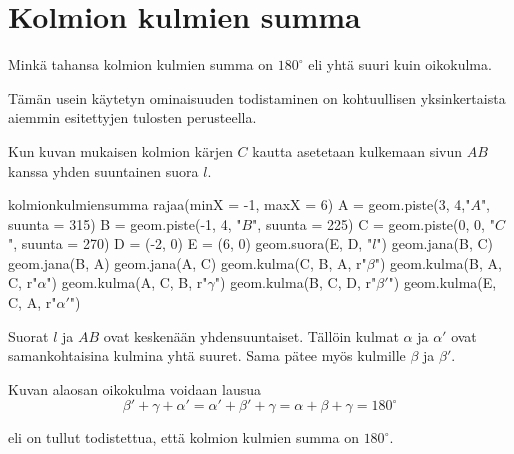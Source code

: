 \section*{Kolmion kulmien summa}

Minkä tahansa kolmion kulmien summa on $ 180^{\circ}$ eli yhtä suuri kuin oikokulma.

Tämän usein käytetyn ominaisuuden todistaminen on kohtuullisen yksinkertaista aiemmin esitettyjen tulosten perusteella.

Kun kuvan mukaisen kolmion kärjen $C$ kautta asetetaan kulkemaan sivun $AB$ kanssa yhden suuntainen suora $l$.




\begin{kuva}{kolmionkulmiensumma}
	rajaa(minX = -1, maxX = 6)
	A = geom.piste(3, 4,"$A$", suunta = 315)
	B = geom.piste(-1, 4, "$B$", suunta = 225)
	C = geom.piste(0, 0, "$C$", suunta = 270)
	D = (-2, 0)
	E = (6, 0)
	geom.suora(E, D, "$l$")
	geom.jana(B, C)
	geom.jana(B, A)
	geom.jana(A, C)
	geom.kulma(C, B, A, r"$\beta$")
	geom.kulma(B, A, C, r"$\alpha$")
	geom.kulma(A, C, B, r"$\gamma$")
	geom.kulma(B, C, D, r"$\beta'$")
	geom.kulma(E, C, A, r"$\alpha'$")
\end{kuva}

Suorat $l$ ja $AB$ ovat keskenään yhdensuuntaiset. Tällöin kulmat $\alpha$ ja $\alpha'$ ovat samankohtaisina kulmina yhtä suuret. Sama pätee myös kulmille $\beta$ ja $\beta'$.

Kuvan alaosan oikokulma voidaan lausua
\[\beta' + \gamma + \alpha'=\alpha' + \beta' + \gamma=\alpha+ \beta + \gamma=180^\circ\]

eli on tullut todistettua, että kolmion kulmien summa on $180^\circ$.
 



 